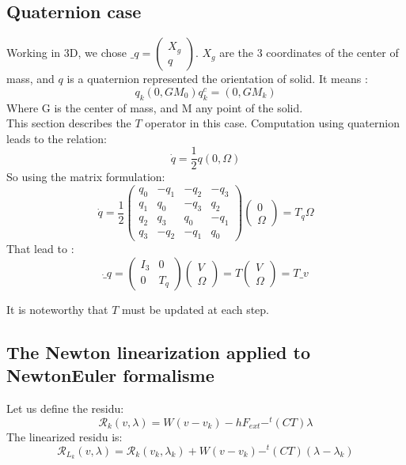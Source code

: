 \subsection{Quaternion case}
Working in 3D, we chose $\_q= \left(\begin{array}{l} X_g \\q \end{array}\right) $. $X_g$ are the 3 coordinates of the center of mass, and $q$ is a quaternion
  represented the orientation of solid. It means :
  \[q_k(0,GM_0)q_k^c = (0,GM_k)\]
Where G is the center of mass, and M any point of the solid.\\
This section describes the $T$ operator in this case. Computation using quaternion leads to the relation:
\[\dot q = \frac{1}{2} q (0,\Omega)\]
So using the matrix formulation:
\[\dot q = \frac{1}{2}  \left(\begin{array}{cccc} q_0&-q_1&-q_2&-q_3 \\ q_1&q_0&-q_3&q_2\\
  q_2&q_3&q_0&-q_1\\ q_3&-q_2&-q_1&q_0\end{array}\right)  \left(\begin{array}{c} 0 \\ \Omega
  \end{array}\right) =
  T_q   \Omega  \]
  That lead to :
  \[ \dot \_q = \left(\begin{array}{cc} I_3 & 0 \\ 0 &
  T_q \end{array}\right) \left(\begin{array}{c} V\\ \Omega  \end{array}\right)  = T
  \left(\begin{array}{c} V\\ \Omega  \end{array}\right)=T \_v\]

It is noteworthy that $T$ must be updated at each step.

\subsection{The Newton linearization applied to NewtonEuler formalisme}
  Let us define the residu:
\begin{equation}
  \label{eq:newton_NE1_residu}
  \mathcal R_k (v,\lambda) =W(v-v_k)-hF_{ext}-^t(CT)\lambda
\end{equation}
The linearized residu is:
\begin{equation}
  \label{eq:newton_NE1_residuL}
  \mathcal R_{L_k} (v,\lambda) =\mathcal R_k (v_k,\lambda_k)+W(v-v_k)-^t(CT)(\lambda - \lambda_k)
\end{equation}

